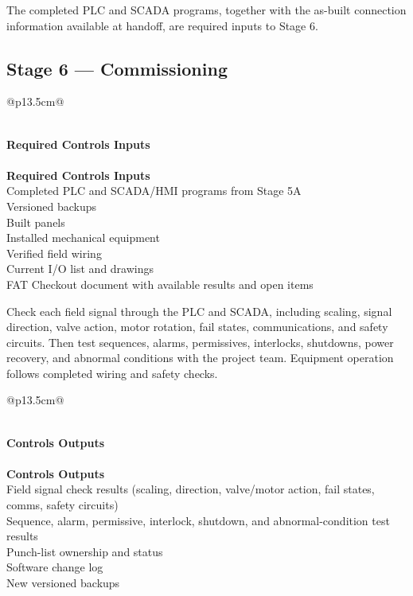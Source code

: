 The completed PLC and SCADA programs, together with the as-built connection information available at handoff, are required inputs to Stage 6.

\subsection{Stage 6 --- Commissioning}

\begin{longtable}{@{}p{13.5cm}@{}}
\caption{Stage 6 --- Required Controls Inputs}\label{tab:stage6-inputs} \\
\toprule
{}\textbf{Required Controls Inputs} \\
\midrule
\endfirsthead
{} \\
\toprule
{}\textbf{Required Controls Inputs} \\
\midrule
\endhead
Completed PLC and SCADA/HMI programs from Stage 5A \\
Versioned backups \\
Built panels \\
Installed mechanical equipment \\
Verified field wiring \\
Current I/O list and drawings \\
FAT Checkout document with available results and open items \\
\bottomrule
\end{longtable}

Check each field signal through the PLC and SCADA, including scaling, signal direction, valve action, motor rotation, fail states, communications, and safety circuits. Then test sequences, alarms, permissives, interlocks, shutdowns, power recovery, and abnormal conditions with the project team. Equipment operation follows completed wiring and safety checks.

\begin{longtable}{@{}p{13.5cm}@{}}
\caption{Stage 6 --- Controls Outputs}\label{tab:stage6-outputs} \\
\toprule
{}\textbf{Controls Outputs} \\
\midrule
\endfirsthead
{} \\
\toprule
{}\textbf{Controls Outputs} \\
\midrule
\endhead
Field signal check results (scaling, direction, valve/motor action, fail states, comms, safety circuits) \\
Sequence, alarm, permissive, interlock, shutdown, and abnormal-condition test results \\
Punch-list ownership and status \\
Software change log \\
New versioned backups \\
\bottomrule
\end{longtable}

